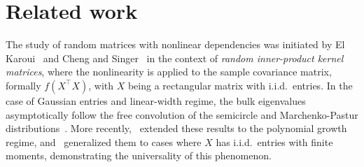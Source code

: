 \section{Related work}
The study of random matrices with nonlinear dependencies was initiated by El Karoui~\cite{elkaroui} and Cheng and Singer~\cite{cheng} in the context of \emph{random inner-product kernel matrices}, where the nonlinearity is applied to the sample covariance matrix, formally \( f (X^\top X)\), with \(X\) being a rectangular matrix with i.i.d.\ entries. In the case of Gaussian entries and linear-width regime, the bulk eigenvalues asymptotically follow the free convolution of the semicircle and Marchenko-Pastur distributions~\cite{cheng,fan2019}. More recently,~\cite{lu2023} extended these results to the polynomial growth regime, and~\cite{dubova2023} generalized them to cases where \(X\) has i.i.d.\ entries with finite moments, demonstrating the universality of this phenomenon.

